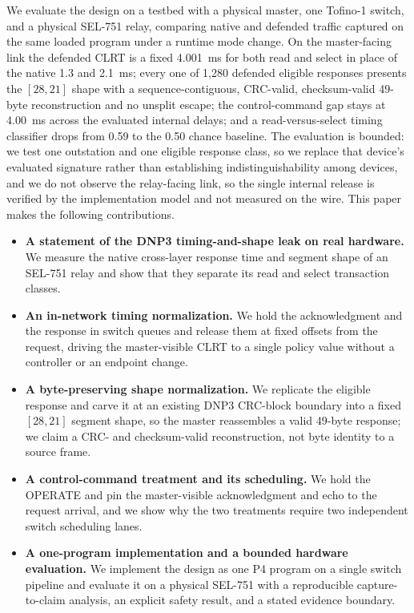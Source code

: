 We evaluate the design on a testbed with a physical master, one Tofino-1 switch, and a physical
SEL-751 relay, comparing native and defended traffic captured on the same loaded program under a
runtime mode change. On the master-facing link the defended CLRT is a fixed 4.001~ms for both read and
select in place of the native 1.3 and 2.1~ms; every one of 1{,}280 defended eligible responses
presents the $[28,21]$ shape with a sequence-contiguous, CRC-valid, checksum-valid 49-byte
reconstruction and no unsplit escape; the control-command gap stays at 4.00~ms across the evaluated
internal delays; and a read-versus-select timing classifier drops from 0.59 to the 0.50 chance
baseline. The evaluation is bounded: we test one outstation and one eligible response class, so we
replace that device's evaluated signature rather than establishing indistinguishability among
devices, and we do not observe the relay-facing link, so the single internal release is verified by
the implementation model and not measured on the wire. This paper makes the following contributions.

\begin{itemize}
\item \textbf{A statement of the DNP3 timing-and-shape leak on real hardware.} We measure the native
cross-layer response time and segment shape of an SEL-751 relay and show that they separate its read
and select transaction classes.
\item \textbf{An in-network timing normalization.} We hold the acknowledgment and the response in
switch queues and release them at fixed offsets from the request, driving the master-visible CLRT to a
single policy value without a controller or an endpoint change.
\item \textbf{A byte-preserving shape normalization.} We replicate the eligible response and carve it
at an existing DNP3 CRC-block boundary into a fixed $[28,21]$ segment shape, so the master reassembles
a valid 49-byte response; we claim a CRC- and checksum-valid reconstruction, not byte identity to a
source frame.
\item \textbf{A control-command treatment and its scheduling.} We hold the OPERATE and pin the
master-visible acknowledgment and echo to the request arrival, and we show why the two treatments
require two independent switch scheduling lanes.
\item \textbf{A one-program implementation and a bounded hardware evaluation.} We implement the design
as one P4 program on a single switch pipeline and evaluate it on a physical SEL-751 with a
reproducible capture-to-claim analysis, an explicit safety result, and a stated evidence boundary.
\end{itemize}
